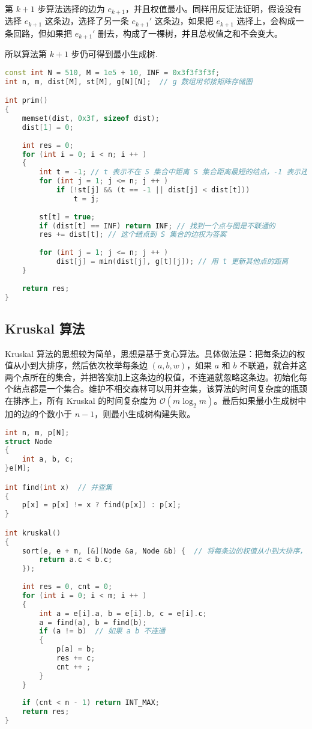 第 $k + 1$ 步算法选择的边为 $e_{k + 1}$，并且权值最小。同样用反证法证明，假设没有选择 $e_{k + 1}$ 这条边，选择了另一条 $e_{k + 1}'$ 这条边，如果把 $e_{k + 1}$ 选择上，会构成一条回路，但如果把 $e_{k + 1}'$ 删去，构成了一棵树，并且总权值之和不会变大。

所以算法第 $k+1$ 步仍可得到最小生成树. 

\begin{lstlisting}[language=cpp]
const int N = 510, M = 1e5 + 10, INF = 0x3f3f3f3f;
int n, m, dist[M], st[M], g[N][N];  // g 数组用邻接矩阵存储图

int prim()
{
    memset(dist, 0x3f, sizeof dist);
    dist[1] = 0;
    
    int res = 0;
    for (int i = 0; i < n; i ++ )
    {
        int t = -1; // t 表示不在 S 集合中距离 S 集合距离最短的结点，-1 表示还没找到
        for (int j = 1; j <= n; j ++ )
            if (!st[j] && (t == -1 || dist[j] < dist[t]))  
                t = j;  
        
        st[t] = true;
        if (dist[t] == INF) return INF; // 找到一个点与图是不联通的
        res += dist[t]; // 这个结点到 S 集合的边权为答案
        
        for (int j = 1; j <= n; j ++ )
            dist[j] = min(dist[j], g[t][j]); // 用 t 更新其他点的距离
    }
     
    return res;
}
\end{lstlisting}

\subsection{Kruskal 算法}

Kruskal 算法的思想较为简单，思想是基于贪心算法。具体做法是：把每条边的权值从小到大排序，然后依次枚举每条边 $(a,b,w)$，如果 $a$ 和 $b$ 不联通，就合并这两个点所在的集合，并把答案加上这条边的权值，不连通就忽略这条边。初始化每个结点都是一个集合。维护不相交森林可以用并查集，该算法的时间复杂度的瓶颈在排序上，所有 Kruskal 的时间复杂度为 $\mathcal{O}(m \log_2 m)$。最后如果最小生成树中加的边的个数小于 $n - 1$，则最小生成树构建失败。

\begin{lstlisting}[language=cpp]
int n, m, p[N];
struct Node
{
    int a, b, c;
}e[M];

int find(int x)  // 并查集
{
    p[x] = p[x] != x ? find(p[x]) : p[x];
}

int kruskal()
{
    sort(e, e + m, [&](Node &a, Node &b) {  // 将每条边的权值从小到大排序，这里使用了 Lambda
        return a.c < b.c;
    });
    
    int res = 0, cnt = 0;
    for (int i = 0; i < m; i ++ )
    {
        int a = e[i].a, b = e[i].b, c = e[i].c;
        a = find(a), b = find(b);
        if (a != b)  // 如果 a b 不连通
        {
            p[a] = b;
            res += c;
            cnt ++ ;
        }
    }
    
    if (cnt < n - 1) return INT_MAX;
    return res;
}


\end{lstlisting}
